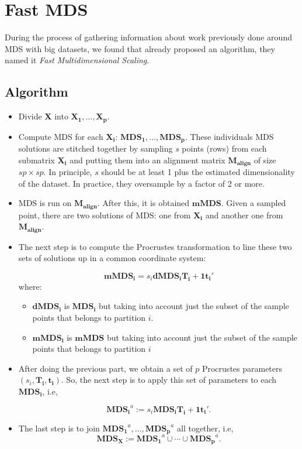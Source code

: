 \documentclass[11pt]{report}
\begin{document}
\section{Fast MDS}
During the process of gathering information about work previously done around
MDS with big datasets, we found that  already proposed an 
algorithm, they named it \textit{Fast Multidimensional Scaling}. 


\subsection{Algorithm}

\begin{itemize}

\item Divide \textbf{X} into $\mathbf{X_1},\dots, \mathbf{X_p}$.

\item Compute MDS for each $\mathbf{X_i}$: 
$\mathbf{MDS_1}, \dots, \mathbf{MDS_p}$. These individuals MDS solutions are 
stitched together by sampling $s$ points (rows) from each submatrix 
$\mathbf{X_i}$ and putting them into an alignment matrix 
$\mathbf{M_{align}}$ of size $sp \times sp$. In principle, $s$ should be at 
least 1 plus the estimated dimensionality of the dataset. In practice, they 
oversample by a factor of 2 or more. 

\item MDS is run on $\mathbf{M_{align}}$. After this, it is obtained
$\mathbf{mMDS}$. Given a sampled point, there are two solutions of MDS: 
one from $\mathbf{X_i}$ and another one from $\mathbf{M_{align}}$.

\item The next step is to compute the Procrustes transformation to  line  
these two sets of solutions up in a common coordinate system:

\[
\mathbf{mMDS_i} = s_i \mathbf{dMDS_i} \mathbf{T_i} + \mathbf{1t_i}'
\]
where:

\begin{itemize}

\item $\mathbf{dMDS_i}$ is $\mathbf{MDS_i}$ but taking into account just
the subset of the sample points that belongs to partition $i$.

\item $\mathbf{mMDS_i}$ is $\mathbf{mMDS}$ but taking into account just
the subset of the sample points that belongs to partition $i$
\end{itemize}

\item After doing the previous part, we obtain a set of $p$ Procrustes 
parameters $(s_i, \mathbf{T_i},  \mathbf{t_i})$. So, the next step is to 
apply this set of parameters to each $\mathbf{MDS_i}$, i.e, 

\[
\mathbf{MDS_i}^a := s_i \mathbf{MDS_i} \mathbf{T_i} + \mathbf{1t_i'}.
\]

\item The last step is to join $\mathbf{MDS_1}^a, \dots,  \mathbf{MDS_p}^a$ 
all together, i.e, 
\[
\mathbf{MDS_X}:= \mathbf{MDS_1}^a \cup \cdots \cup \mathbf{MDS_p}^a.
\]

\end{itemize}
\end{document}
